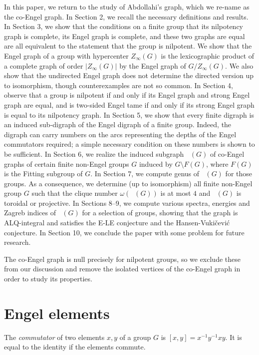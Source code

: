 \documentclass[reqno,12pt]{amsart}
\theoremstyle{plain}
\theoremstyle{definition}
\newcommand{\coeng}{\mathop{\mathcal{E}_c^-}}
\begin{document}
In this paper, we return to the study of Abdollahi's graph, which we re-name as the co-Engel graph. In Section 2, we recall the necessary definitions and results.
In Section 3, we show that the
conditions on a finite group that its nilpotency graph is complete, its
Engel graph is complete, and these two graphs are equal are all equivalent
to the statement that the group is nilpotent. We  show that the Engel
graph of a group with hypercenter $Z_\infty(G)$ is the lexicographic product
of a complete graph of order $|Z_\infty(G)|$ by the Engel graph of
$G/Z_\infty(G)$. We also show that  the undirected Engel graph does not determine the directed
version up to isomorphism, though counterexamples are not so common. In Section 4, observe that a group is nilpotent if and only if its Engel graph and strong Engel graph are equal, and is two-sided Engel tame if and only if its strong Engel graph is
equal to its nilpotency graph.  In Section 5, we show that every finite digraph is an induced sub-digraph of the Engel digraph of a finite group. Indeed, the digraph can carry numbers on the
arcs representing the depths of the Engel commutators required; a simple
necessary condition on these numbers is shown to be sufficient. In Section 6,  we realize the induced subgraph $\coeng(G)$  of  co-Engel graphs of certain finite non-Engel groups $G$ induced by $G \setminus F(G)$, where $F(G)$ is the Fitting subgroup of $G$. In Section 7, we compute genus of $\coeng(G)$
for those groups. As a consequence, we determine (up to isomorphism) all finite non-Engel group $G$ such that the clique number $\omega(\coeng(G))$ is at most
$4$ and $\coeng(G)$ is toroidal or projective. In Sections 8--9, we compute various  spectra, energies and Zagreb indices of $\coeng(G)$ for a selection of
groups, showing that the graph is ALQ-integral and satisfies the E-LE
conjecture and the Hansen-Vuki\v{c}evi\'c conjecture. In Section 10, we conclude the paper with some problem for future research.

The co-Engel graph is null precisely for nilpotent groups,
so we exclude these from our discussion and remove the isolated vertices of
the co-Engel graph in order to study its properties.

\section{Engel elements}

The \emph{commutator} of two elements $x,y$ of a group $G$ is 
$[x,y]=x^{-1}y^{-1}xy$. It is equal to the identity if the elements commute.
\end{document}
